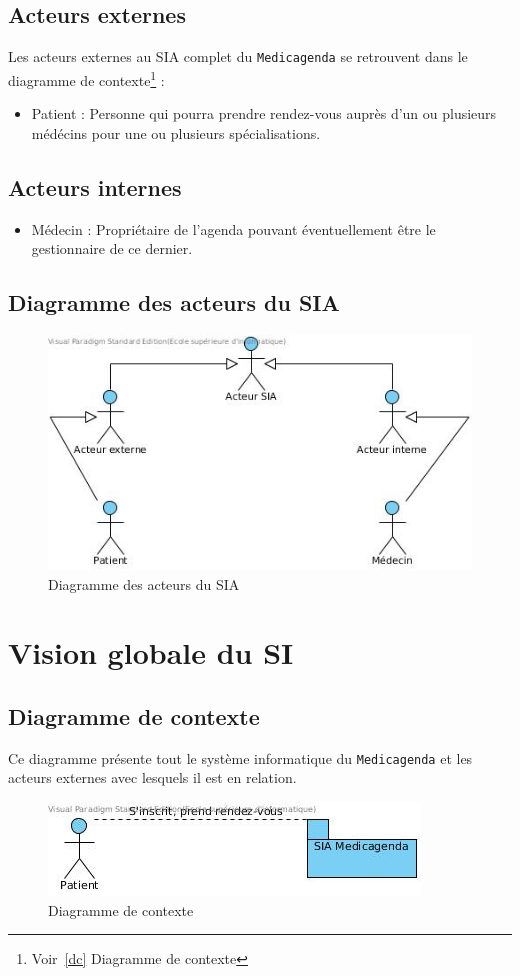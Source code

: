 \subsection{Acteurs externes}
Les acteurs externes au SIA complet du \texttt{Medicagenda} se retrouvent dans le 
diagramme de contexte\footnote{Voir~\ref{dc} Diagramme de contexte} : 
\begin{itemize}
	\item Patient : Personne qui pourra prendre rendez-vous auprès d'un ou
		plusieurs médécins pour une ou plusieurs spécialisations.
\end{itemize}
\subsection{Acteurs internes}
\begin{itemize}
	\item Médecin : Propriétaire de l'agenda pouvant éventuellement être le
		gestionnaire de ce dernier.
\end{itemize}
\subsection{Diagramme des acteurs du SIA}
\begin{figure}[hb]
	\centering
	\includegraphics[scale=0.7]{MCT/acteurs.jpg}
	\caption{Diagramme des acteurs du SIA}
	\label{fig:acteurs}
\end{figure}
\newpage
\section{Vision globale du SI}
\subsection{\label{dc}Diagramme de contexte}
Ce diagramme présente tout le système informatique du \texttt{Medicagenda} et les acteurs 
externes avec lesquels il est en relation. 
\begin{figure}[hb]
	\centering
	\includegraphics[scale=0.7]{MCT/contexte.jpg}
	\caption{Diagramme de contexte}
	\label{fig:contexte}
\end{figure}
